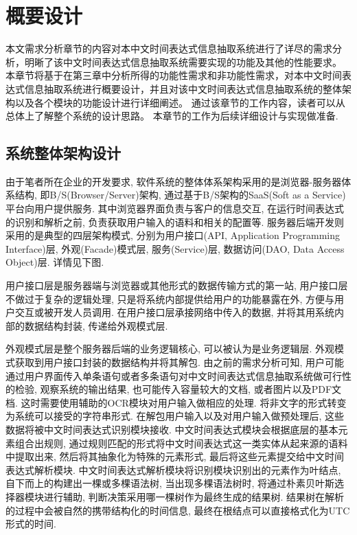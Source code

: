 

\chapter{概要设计}

本文需求分析章节的内容对本中文时间表达式信息抽取系统进行了详尽的需求分析，明晰了该中文时间表达式信息抽取系统需要实现的功能及其他的性能要求。
本章节将基于在第三章中分析所得的功能性需求和非功能性需求，对本中文时间表达式信息抽取系统进行概要设计，并且对该中文时间表达式信息抽取系统的整体架构以及各个模块的功能设计进行详细阐述。
通过该章节的工作内容，读者可以从总体上了解整个系统的设计思路。
本章节的工作为后续详细设计与实现做准备.

\section{系统整体架构设计}

由于笔者所在企业的开发要求, 软件系统的整体体系架构采用的是浏览器-服务器体系结构, 即B/S(Browser/Server)架构, 通过基于B/S架构的SaaS(Soft as a Service)平台向用户提供服务.
其中浏览器界面负责与客户的信息交互, 在运行时间表达式的识别和解析之前, 负责获取用户输入的语料和相关的配置等.
服务器后端开发则采用的是典型的四层架构模式, 分别为用户接口(API, Application Programming Interface)层, 外观(Facade)模式层, 服务(Service)层, 数据访问(DAO, Data Access Object)层. 详情见下图.

用户接口层是服务器端与浏览器或其他形式的数据传输方式的第一站, 用户接口层不做过于复杂的逻辑处理, 只是将系统内部提供给用户的功能暴露在外, 方便与用户交互或被开发人员调用.
在用户接口层承接网络中传入的数据, 并将其用系统内部的数据结构封装, 传递给外观模式层.

外观模式层是整个服务器后端的业务逻辑核心, 可以被认为是业务逻辑层. 外观模式获取到用户接口封装的数据结构并将其解包.
由之前的需求分析可知, 用户可能通过用户界面传入单条语句或者多条语句对中文时间表达式信息抽取系统做可行性的检验, 观察系统的输出结果,
也可能传入容量较大的文档, 或者图片以及PDF文档. 这时需要使用辅助的OCR模块对用户输入做相应的处理. 将非文字的形式转变为系统可以接受的字符串形式.
在解包用户输入以及对用户输入做预处理后, 这些数据将被中文时间表达式识别模块接收.
中文时间表达式模块会根据底层的基本元素组合出规则, 通过规则匹配的形式将中文时间表达式这一类实体从起来源的语料中提取出来, 然后将其抽象化为特殊的元素形式, 最后将这些元素提交给中文时间表达式解析模块.
中文时间表达式解析模块将识别模块识别出的元素作为叶结点, 自下而上的构建出一棵或多棵语法树, 当出现多棵语法树时, 将通过朴素贝叶斯选择器模块进行辅助, 判断决策采用哪一棵树作为最终生成的结果树.
结果树在解析的过程中会被自然的携带结构化的时间信息, 最终在根结点可以直接格式化为UTC形式的时间.

